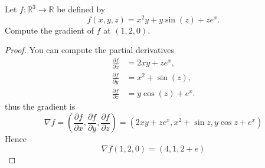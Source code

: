 \documentclass[openany]{book}
\begin{document}







\begin{prob}
    Let \( f : \mathbb{R}^3 \to \mathbb{R} \) be defined by  
\[
f(x, y, z) = x^2 y + y \sin(z) + z e^x.
\]  
Compute the gradient of $f$ at $(1,2,0)$.
\end{prob}
\begin{proof}
    You can compute the partial derivatives 
    \begin{align*}
        \frac{\partial f}{\partial x} &= 2xy + ze^x, \\
        \frac{\partial f}{\partial y} &= x^2 + \sin(z), \\
        \frac{\partial f}{\partial z} &= y \cos(z) + e^x.
        \end{align*}
    thus the gradient is 
    \[
\nabla f = \left( \frac{\partial f}{\partial x}, \frac{\partial f}{\partial y}, \frac{\partial f}{\partial z} \right)=(2xy+ze^x, x^2+\sin z, y\cos z+e^x)
\]
Hence 
\begin{equation*}
    \nabla f(1,2,0)=(4, 1, 2+e)
\end{equation*}

\end{proof}
\end{document}
